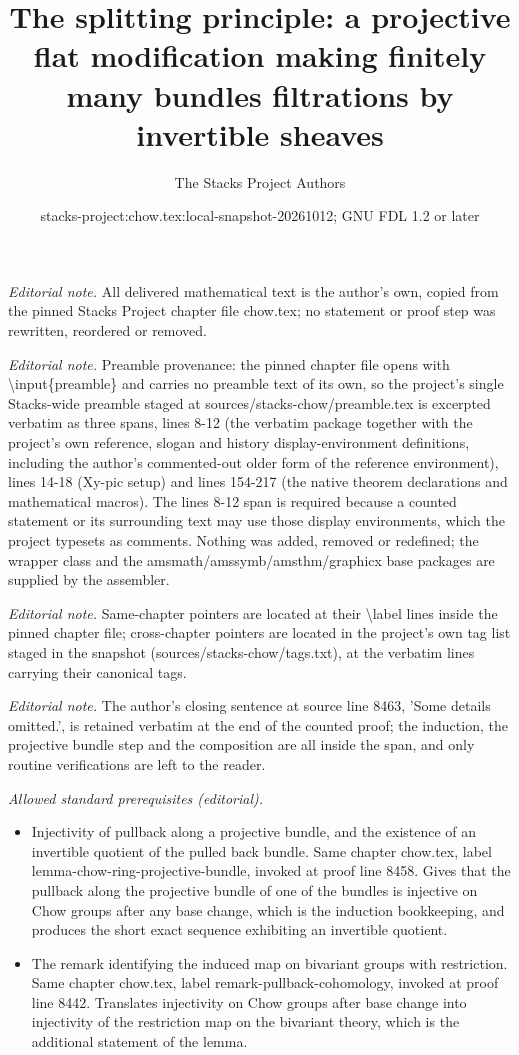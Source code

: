 \documentclass[10pt,a4paper]{amsart}
\title{The splitting principle: a projective flat modification making finitely many bundles filtrations by invertible sheaves}
\author{The Stacks Project Authors}
\date{stacks-project:chow.tex:local-snapshot-20261012; GNU FDL 1.2 or later}
\theoremstyle{plain}
\theoremstyle{definition}
\theoremstyle{remark}
\numberwithin{equation}{subsection}
\begin{document}
\maketitle
\noindent\textit{Editorial note.} All delivered mathematical text is the author's own, copied from the pinned Stacks Project chapter file chow.tex; no statement or proof step was rewritten, reordered or removed.\par\medskip
\noindent\textit{Editorial note.} Preamble provenance: the pinned chapter file opens with \textbackslash{}input\{preamble\} and carries no preamble text of its own, so the project's single Stacks-wide preamble staged at sources/stacks-chow/preamble.tex is excerpted verbatim as three spans, lines 8-12 (the verbatim package together with the project's own reference, slogan and history display-environment definitions, including the author's commented-out older form of the reference environment), lines 14-18 (Xy-pic setup) and lines 154-217 (the native theorem declarations and mathematical macros). The lines 8-12 span is required because a counted statement or its surrounding text may use those display environments, which the project typesets as comments. Nothing was added, removed or redefined; the wrapper class and the amsmath/amssymb/amsthm/graphicx base packages are supplied by the assembler.\par\medskip
\noindent\textit{Editorial note.} Same-chapter pointers are located at their \textbackslash{}label lines inside the pinned chapter file; cross-chapter pointers are located in the project's own tag list staged in the snapshot (sources/stacks-chow/tags.txt), at the verbatim lines carrying their canonical tags.\par\medskip
\noindent\textit{Editorial note.} The author's closing sentence at source line 8463, 'Some details omitted.', is retained verbatim at the end of the counted proof; the induction, the projective bundle step and the composition are all inside the span, and only routine verifications are left to the reader.\par\medskip
\noindent\textit{Allowed standard prerequisites (editorial).}\begin{itemize}
\item Injectivity of pullback along a projective bundle, and the existence of an invertible quotient of the pulled back bundle. Same chapter chow.tex, label lemma-chow-ring-projective-bundle, invoked at proof line 8458. Gives that the pullback along the projective bundle of one of the bundles is injective on Chow groups after any base change, which is the induction bookkeeping, and produces the short exact sequence exhibiting an invertible quotient.
\item The remark identifying the induced map on bivariant groups with restriction. Same chapter chow.tex, label remark-pullback-cohomology, invoked at proof line 8442. Translates injectivity on Chow groups after base change into injectivity of the restriction map on the bivariant theory, which is the additional statement of the lemma.
\end{itemize}\medskip
\end{document}
